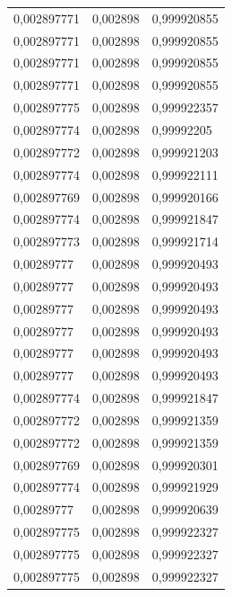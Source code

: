 \begin{center}
\begin{longtable}{|l|l|l|}
0,002897771        & 0,002898              & 0,999920855  \\
0,002897771        & 0,002898              & 0,999920855  \\
0,002897771        & 0,002898              & 0,999920855  \\
0,002897771        & 0,002898              & 0,999920855  \\
0,002897775        & 0,002898              & 0,999922357  \\
0,002897774        & 0,002898              & 0,99992205   \\
0,002897772        & 0,002898              & 0,999921203  \\
0,002897774        & 0,002898              & 0,999922111  \\
0,002897769        & 0,002898              & 0,999920166  \\
0,002897774        & 0,002898              & 0,999921847  \\
0,002897773        & 0,002898              & 0,999921714  \\
0,00289777         & 0,002898              & 0,999920493  \\
0,00289777         & 0,002898              & 0,999920493  \\
0,00289777         & 0,002898              & 0,999920493  \\
0,00289777         & 0,002898              & 0,999920493  \\
0,00289777         & 0,002898              & 0,999920493  \\
0,00289777         & 0,002898              & 0,999920493  \\
0,002897774        & 0,002898              & 0,999921847  \\
0,002897772        & 0,002898              & 0,999921359  \\
0,002897772        & 0,002898              & 0,999921359  \\
0,002897769        & 0,002898              & 0,999920301  \\
0,002897774        & 0,002898              & 0,999921929  \\
0,00289777         & 0,002898              & 0,999920639  \\
0,002897775        & 0,002898              & 0,999922327  \\
0,002897775        & 0,002898              & 0,999922327  \\
0,002897775        & 0,002898              & 0,999922327  \\

\end{longtable}
\end{center}
